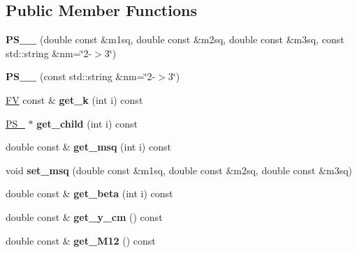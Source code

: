 \subsection*{Public Member Functions}
\begin{DoxyCompactItemize}
\item 
\hypertarget{classPS__2__3_ab8f2664ecfc751cc67758877b1faaf1a}{}{\bfseries P\+S\+\_\+\_} (double const \&m1sq, double const \&m2sq, double const \&m3sq, const std\+::string \&nm=\char`\"{}2-\/$>$3\char`\"{})\label{classPS__2__3_ab8f2664ecfc751cc67758877b1faaf1a}

\item 
\hypertarget{classPS__2__3_a70c48a6882d721f7bbd4303fc435f0ef}{}{\bfseries P\+S\+\_\+\_} (const std\+::string \&nm=\char`\"{}2-\/$>$3\char`\"{})\label{classPS__2__3_a70c48a6882d721f7bbd4303fc435f0ef}

\item 
\hypertarget{classPS__2__3_ad94c48b0f0f0d85a9fe2eda8ab86ed4c}{}\hyperlink{classFV}{F\+V} const \& {\bfseries get\+\_\+k} (int i) const \label{classPS__2__3_ad94c48b0f0f0d85a9fe2eda8ab86ed4c}

\item 
\hypertarget{classPS__2__3_a60f08c495bc4adb2c7cd172ffb5a5ee8}{}\hyperlink{classPS__2}{P\+S\+\_} $\ast$ {\bfseries get\+\_\+child} (int i) const \label{classPS__2__3_a60f08c495bc4adb2c7cd172ffb5a5ee8}

\item 
\hypertarget{classPS__2__3_a4d60a9ea4e6348616b9f5359b151dac7}{}double const \& {\bfseries get\+\_\+msq} (int i) const \label{classPS__2__3_a4d60a9ea4e6348616b9f5359b151dac7}

\item 
\hypertarget{classPS__2__3_a25fc55beb243e18d8edfabdae7aa1d47}{}void {\bfseries set\+\_\+msq} (double const \&m1sq, double const \&m2sq, double const \&m3sq)\label{classPS__2__3_a25fc55beb243e18d8edfabdae7aa1d47}

\item 
\hypertarget{classPS__2__3_a859deb3d64ac6964a74a6d395d665b03}{}double const \& {\bfseries get\+\_\+beta} (int i) const \label{classPS__2__3_a859deb3d64ac6964a74a6d395d665b03}

\item 
\hypertarget{classPS__2__3_ab8b97616752d6c90ae43b3e5433dfb9c}{}double const \& {\bfseries get\+\_\+y\+\_\+cm} () const \label{classPS__2__3_ab8b97616752d6c90ae43b3e5433dfb9c}

\item 
\hypertarget{classPS__2__3_a064b972db40cb6ac0bb77232dbc31a84}{}double const \& {\bfseries get\+\_\+\+M12} () const \label{classPS__2__3_a064b972db40cb6ac0bb77232dbc31a84}


\end{DoxyCompactItemize}
